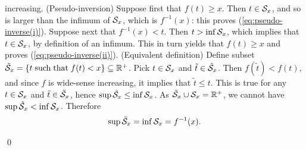 increasing.
\vspace{1ex}
\noindent (Pseudo-inversion) Suppose
first that $f(t) \geq x$. Then  $t \in \mathcal S_{x}$, and so is
larger than the infimum of $\mathcal S_{x}$, which is $f^{-1}(x)$: this
proves (\ref{eq:pseudo-inverse(i)}).
Suppose next that $f^{-1}(x) < t$. Then  $t > \inf \mathcal S_{x}$, which implies that
$t \in \mathcal S_{x}$, by definition of an infimum. This in turn yields that $f(t) \geq x$
and proves (\ref{eq:pseudo-inverse(ii)}).
%
%
%
%
\vspace{1ex}
\noindent
(Equivalent definition) Define subset $\tilde{\mathcal S}_{x} = \left\{ t \mathrm{\; such \; that \; } f(t) < x \right\} \subseteq \mathbb{R}^{+}$. Pick $t \in \mathcal S_x$ and $\tilde{t} \in \tilde{\mathcal S}_{x}$. Then $f(\tilde{t}) < f(t)$, and since $f$ is wide-sense increasing, it implies that $\tilde{t} \leq t$. This is true for any  $t \in \mathcal S_x$ and $\tilde{t} \in \tilde{\mathcal S}_{x}$, hence $\sup \tilde{\mathcal S}_{x} \leq \inf \mathcal S_{x} $. As $\tilde{\mathcal S}_{x} \cup \mathcal S_{x} = \mathbb{R}^{+}$, we cannot have $\sup \tilde{\mathcal S}_{x} < \inf \mathcal S_{x} $. Therefore
$$ \sup \tilde{\mathcal S}_{x} =  \inf \mathcal S_{x} = f^{-1}(x). $$
%
%

%
\qed
